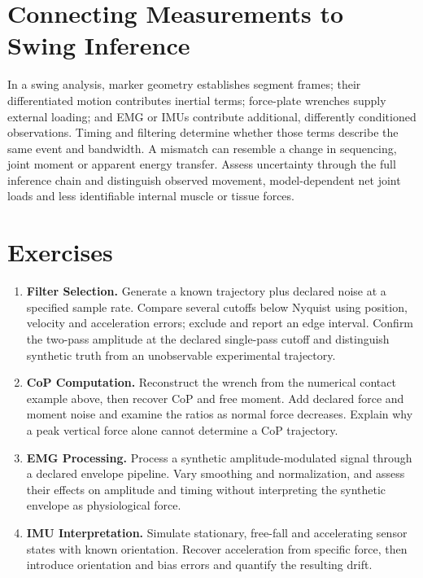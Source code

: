 \section{Connecting Measurements to Swing Inference}

In a swing analysis, marker geometry establishes segment frames; their differentiated motion contributes inertial terms; force-plate wrenches supply external loading; and EMG or IMUs contribute additional, differently conditioned observations.
Timing and filtering determine whether those terms describe the same event and bandwidth.
A mismatch can resemble a change in sequencing, joint moment or apparent energy transfer.
Assess uncertainty through the full inference chain and distinguish observed movement, model-dependent net joint loads and less identifiable internal muscle or tissue forces.

\section*{Exercises}

\begin{enumerate}
  \item \textbf{Filter Selection.}
  Generate a known trajectory plus declared noise at a specified sample rate.
  Compare several cutoffs below Nyquist using position, velocity and acceleration errors; exclude and report an edge interval.
  Confirm the two-pass amplitude at the declared single-pass cutoff and distinguish synthetic truth from an unobservable experimental trajectory.
  \item \textbf{CoP Computation.}
  Reconstruct the wrench from the numerical contact example above, then recover CoP and free moment.
  Add declared force and moment noise and examine the ratios as normal force decreases.
  Explain why a peak vertical force alone cannot determine a CoP trajectory.
  \item \textbf{EMG Processing.}
  Process a synthetic amplitude-modulated signal through a declared envelope pipeline.
  Vary smoothing and normalization, and assess their effects on amplitude and timing without interpreting the synthetic envelope as physiological force.
  \item \textbf{IMU Interpretation.}
  Simulate stationary, free-fall and accelerating sensor states with known orientation.
  Recover acceleration from specific force, then introduce orientation and bias errors and quantify the resulting drift.
\end{enumerate}
